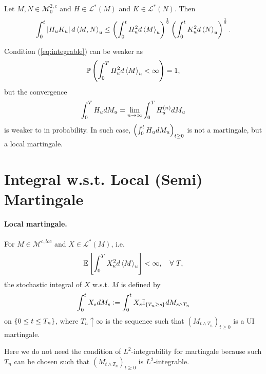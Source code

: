\begin{prop}
    Let $M,N \in \mathcal{M}^{2,c}_0$ and $H\in \mathcal{L}^*(M)$ and $K\in \mathcal{L}^*(N)$. Then
    \begin{equation*}
        \int_0^t \left\lvert H_uK_u\right\lvert d \left\langle M,N \right\rangle_u \leq \left(\int_0^t H_u^2 d\left\langle M \right\rangle_u\right)^\frac{1}{2}\left(\int_0^t K_u^2 d\left\langle N \right\rangle_u\right)^\frac{1}{2}.
    \end{equation*}
\end{prop}

\begin{rmk}
    Condition (\ref{eq:integrable}) can be weaker as
    \begin{equation*}
        \mathbb{P}\left(\int_0^T H^2_u d\left\langle M \right\rangle_u < \infty\right) = 1,
    \end{equation*}
    but the convergence
    \begin{equation*}
        \int_0^T H_u dM_u = \lim_{n \rightarrow \infty} \int_0^T H^{(n)}_u dM_u
    \end{equation*}
    is weaker to in probability. In such case, $\left(\int_0^t H_u dM_u\right)_{t \geq 0}$ is not a martingale, but a local martingale.
\end{rmk}

\section{Integral w.s.t. Local (Semi) Martingale}

\paragraph{Local martingale.}

\begin{defn}
    For $M \in \mathcal{M}^{c,loc}$ and $X \in \mathcal{L}^*(M)$, i.e.
    \begin{equation*}
        \mathbb{E}\left[\int_0^T X^2_u d\left\langle M \right\rangle_u\right] < \infty,\quad\forall~T,
    \end{equation*}
    the stochastic integral of $X$ w.s.t. $M$ is defined by
    \begin{equation*}
        \int_0^t X_s dM_s \vcentcolon= \int_0^t X_s \mathbb{I}_{\left\{T_n \geq s\right\}}dM_{s \wedge T_n}
    \end{equation*}
    on $\left\{0 \leq t \leq T_n\right\}$, where $T_n \uparrow \infty$ is the sequence such that $(M_{t \wedge T_n})_{t \geq 0}$ is a UI martingale.
\end{defn}
\begin{rmk}
    Here we do not need the condition of $L^2$-integrability for martingale because such $T_n$ can be chosen such that $(M_{t \wedge T_n})_{t \geq 0}$ is $L^2$-integrable.
\end{rmk}

